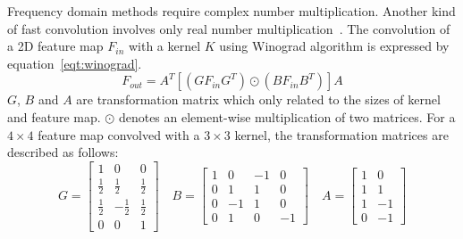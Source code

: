 Frequency domain methods require complex number multiplication. Another kind of fast convolution involves only real number multiplication~\cite{winograd1980arithmetic}. The convolution of a 2D feature map $F_{in}$ with a kernel $K$ using Winograd algorithm is expressed by equation~\ref{eqt:winograd}.
\begin{equation}\label{eqt:winograd}
    F_{out} = A^T[(GF_{in}G^T)\odot(BF_{in}B^T)]A
\end{equation}
$G$, $B$ and $A$ are transformation matrix which only related to the sizes of kernel and feature map. $\odot$ denotes an element-wise multiplication of two matrices. For a $4\times 4$ feature map convolved with a $3\times 3$ kernel, the transformation matrices are described as follows:
\begin{equation*}
    G = \left[
        \begin{array}{ccc}
            1           & 0            & 0           \\
            \frac{1}{2} & \frac{1}{2}  & \frac{1}{2} \\
            \frac{1}{2} & -\frac{1}{2} & \frac{1}{2} \\
            0           & 0            & 1
        \end{array}    
    \right] \quad
    B = \left[
        \begin{array}{cccc}
            1 & 0  & -1 & 0 \\
            0 & 1  & 1  & 0 \\
            0 & -1 & 1  & 0 \\
            0 & 1  & 0  & -1
        \end{array}
    \right] \quad
    A = \left[
        \begin{array}{cc}
            1 & 0  \\
            1 & 1  \\
            1 & -1 \\
            0 & -1 
        \end{array}
    \right]
\end{equation*}

